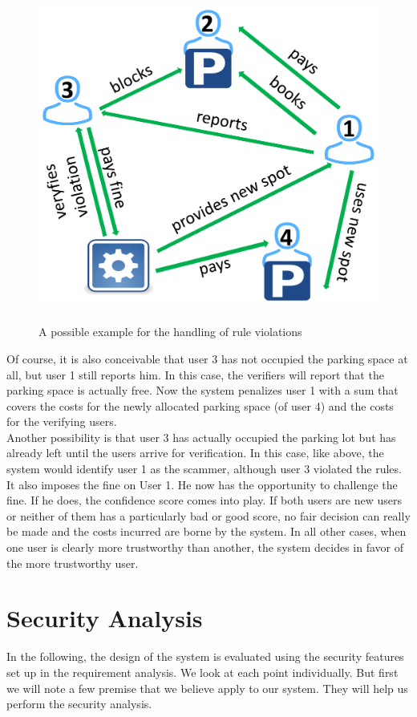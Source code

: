 \documentclass[
a4paper,     %
titlepage,   %
14pt         %
]{scrartcl}  %
\theoremstyle{mystyle}
\begin{document}
\begin{figure}
	\centering
	\includegraphics[width=13cm,height=11cm]{example_grafik.pdf}
	\caption{A possible example for the handling of rule violations}
	\label{img:example-grafik}
\end{figure}
 
Of course, it is also conceivable that user 3 has not occupied the parking space at all, but user 1 still reports him. In this case, the verifiers will report that the parking space is actually free. Now the system penalizes user 1 with a sum that covers the costs for the newly allocated parking space (of user 4) and the costs for the verifying users.\\

Another possibility is that user 3 has actually occupied the parking lot but has already left until the users arrive for verification. In this case, like above, the system would identify user 1 as the scammer, although user 3 violated the rules. It also imposes the fine on User 1. He now has the opportunity to challenge the fine. If he does, the confidence score comes into play. If both users are new users or neither of them has a particularly bad or good score, no fair decision can really be made and the costs incurred are borne by the system. In all other cases, when one user is clearly more trustworthy than another, the system decides in favor of the more trustworthy user.


\section{Security Analysis}
In the following, the design of the system is evaluated using the security features set up in the requirement analysis. We look at each point individually. But first we will note a few premise that we believe apply to our system. They will help us perform the security analysis.
\end{document}
